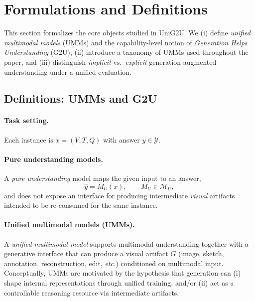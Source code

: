 \documentclass{article}
\theoremstyle{plain}
\theoremstyle{definition}
\theoremstyle{remark}
\begin{document}
\section{Formulations and Definitions}
\label{sec:formulation}

This section formalizes the core objects studied in UniG2U.
We (i) define \emph{unified multimodal models} (UMMs) and the capability-level notion of \emph{Generation Helps Understanding} (G2U),
(ii) introduce a taxonomy of UMMs used throughout the paper, and
(iii) distinguish \emph{implicit} vs.\ \emph{explicit} generation-augmented understanding under a unified evaluation.

\subsection{Definitions: UMMs and G2U}
\label{sec:unified_model_def}

\paragraph{Task setting.}
Each instance is $x=(V,T,Q)$ with answer $y\in\mathcal{Y}$.

\paragraph{Pure understanding models.}
A \emph{pure understanding} model maps the given input to an answer,
\begin{equation}
\hat{y}=M_U(x), \qquad M_U\in\mathcal{M}_U,
\end{equation}
and does not expose an interface for producing intermediate \emph{visual} artifacts intended to be re-consumed for the same instance.

\paragraph{Unified multimodal models (UMMs).}
A \emph{unified multimodal model} supports multimodal understanding together with a generative interface that can produce
a visual artifact $G$ (image, sketch, annotation, reconstruction, edit, \emph{etc.}) conditioned on multimodal input.
Conceptually, UMMs are motivated by the hypothesis that generation can (i) shape internal representations through unified training,
and/or (ii) act as a controllable reasoning resource via intermediate artifacts.
\end{document}
